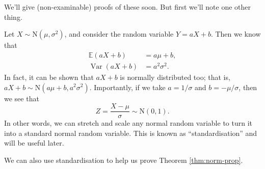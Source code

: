 \documentclass[
  a4paper,
]{book}
\theoremstyle{definition}
\theoremstyle{definition}
\theoremstyle{definition}
\theoremstyle{definition}
\theoremstyle{remark}
\begin{document}
We'll give (non-examinable) proofs of these soon. But first we'll note one other thing.

Let \(X \sim \mathrm{N}(\mu, \sigma^2)\), and consider the random variable \(Y = aX + b\). Then we know that
\begin{align*}
\mathbb E(aX + b) &= a\mu + b , \\
\operatorname{Var}(aX + b) &= a^2 \sigma^2 .
\end{align*}
In fact, it can be shown that \(aX + b\) is normally distributed too; that is, \(aX + b \sim \mathrm{N}(a\mu + b, a^2 \sigma^2)\). Importantly, if we take \(a = 1/\sigma\) and \(b = -\mu/\sigma\), then we see that
\[ Z = \frac{X - \mu}{\sigma} \sim \text{N} (0, 1) . \]
In other words, we can stretch and scale any normal random variable to turn it into a standard normal random variable. This is known as ``standardisation'' and will be useful later.

We can also use standardisation to help us prove Theorem \ref{thm:norm-prop}.
\end{document}
